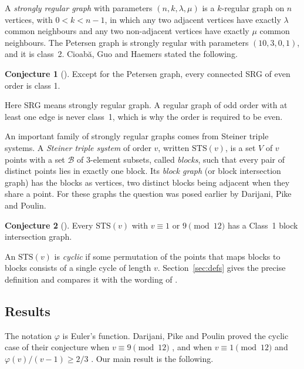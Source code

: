 \documentclass[11pt]{amsart}
\theoremstyle{plain}
\theoremstyle{definition}
\newtheorem*{conjecture}{Conjecture}
\theoremstyle{remark}
\numberwithin{equation}{section}
\newcommand{\cB}{\mathcal{B}}
\newcommand{\STS}{\mathrm{STS}}
\begin{document}
A \emph{strongly regular graph} with parameters \((n,k,\lambda,\mu)\) is a \(k\)-regular graph on \(n\) vertices, with \(0<k<n-1\), in which any two adjacent vertices have exactly \(\lambda\) common neighbours and any two non-adjacent vertices have exactly \(\mu\) common neighbours. The Petersen graph is strongly regular with parameters \((10,3,0,1)\), and it is class~2. Cioab\u{a}, Guo and Haemers stated the following.

\begin{conjecture}[{\cite[Conjecture~1.2]{CGH}}]
Except for the Petersen graph, every connected SRG of even order is class 1.
\end{conjecture}

Here SRG means strongly regular graph. A regular graph of odd order with at least one edge is never class~1, which is why the order is required to be even.

An important family of strongly regular graphs comes from Steiner triple systems. A \emph{Steiner triple system} of order \(v\), written \(\STS(v)\), is a set \(V\) of \(v\) points with a set \(\cB\) of \(3\)-element subsets, called \emph{blocks}, such that every pair of distinct points lies in exactly one block. Its \emph{block graph} (or block intersection graph) has the blocks as vertices, two distinct blocks being adjacent when they share a point. For these graphs the question was posed earlier by Darijani, Pike and Poulin.

\begin{conjecture}[{\cite[Conjecture~1.3]{DPP}}]
Every \(\STS(v)\) with \(v\equiv 1\) or \(9 \pmod{12}\) has a Class~1 block intersection graph.
\end{conjecture}

An \(\STS(v)\) is \emph{cyclic} if some permutation of the points that maps blocks to blocks consists of a single cycle of length \(v\). Section~\ref{sec:defs} gives the precise definition and compares it with the wording of \cite{DPP}.

\subsection{Results}

The notation \(\varphi\) is Euler's function. Darijani, Pike and Poulin proved the cyclic case of their conjecture when \(v\equiv9\pmod{12}\) \cite[Theorem~4.1]{DPP}, and when \(v\equiv1\pmod{12}\) and \(\varphi(v)/(v-1)\ge2/3\) \cite[Theorem~3.1]{DPP}. Our main result is the following.
\end{document}
